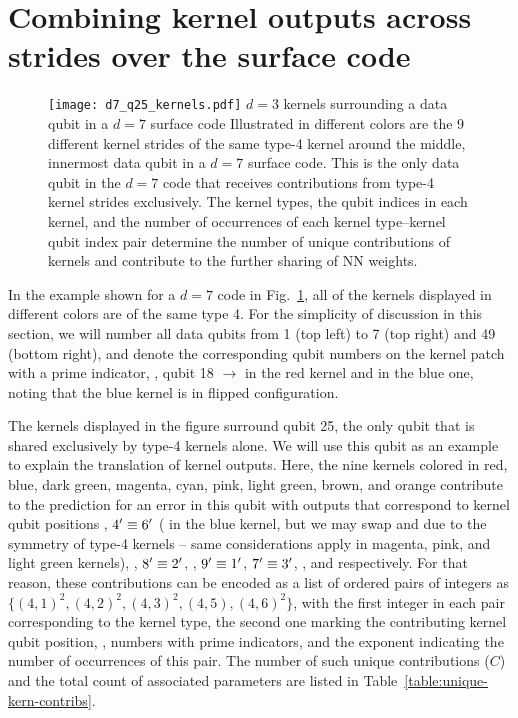\section{Combining kernel outputs across strides over the surface code}
\label{sec:kerncomb}

\begin{figure*}[htb]
\centering
\texttt{[image: d7\_q25\_kernels.pdf]}
\ccaption
{$d=3$ kernels surrounding a data qubit in a $d=7$ surface code}
{
Illustrated in different colors are the 9 different kernel strides of the same type-4 kernel around the middle, innermost data qubit in a $d=7$ surface code. This is the only data qubit in the $d=7$ code that receives contributions from type-4 kernel strides exclusively. The kernel types, the qubit indices in each kernel, and the number of occurrences of each kernel type--kernel qubit index pair determine the number of unique contributions of kernels and contribute to the further sharing of NN weights.
}
\label{fig:d7wkern}
\end{figure*}

In the example shown for a $d=7$ code in Fig.~\ref{fig:d7wkern}, all of the kernels displayed in different colors are of the same type 4. 
For the simplicity of discussion in this section, we will number all data qubits from 1 (top left) to 7 (top right) and 49 (bottom right), and denote the corresponding qubit numbers on the kernel patch with a prime indicator, \eg, qubit 18 $\rightarrow$  in the red kernel and  in the blue one, noting that the blue kernel is in flipped configuration.

The kernels displayed in the figure surround qubit 25, the only qubit that is shared exclusively by type-4 kernels alone.
We will use this qubit as an example to explain the translation of kernel outputs.
Here, the nine kernels colored in red, blue, dark green, magenta, cyan, pink, light green, brown, and orange contribute to the prediction for an error in this qubit with outputs that correspond to kernel qubit positions , $4^\prime\equiv6^\prime$ ( in the blue kernel, but we may swap  and  due to the symmetry of type-4 kernels -- same considerations apply in magenta, pink, and light green kernels), , $8^\prime\equiv2^\prime$, , $9^\prime\equiv1^\prime$, $7^\prime\equiv3^\prime$, , and  respectively. For that reason, these contributions can be encoded as a list of ordered pairs of integers as $\{(4,1)^2, (4,2)^2, (4,3)^2, (4,5), (4,6)^2\}$, with the first integer in each pair corresponding to the kernel type, the second one marking the contributing kernel qubit position, \ie, numbers with prime indicators, and the exponent indicating the number of occurrences of this pair. The number of such unique contributions ($C$) and the total count of associated parameters are listed in Table~\ref{table:unique-kern-contribs}.

